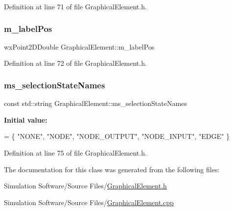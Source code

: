 Definition at line 71 of file Graphical\+Element.\+h.

\mbox{\label{class_graphical_element_acc200c4f7baf224cc972021d0c66cf35}} 
\subsubsection{\texorpdfstring{m\+\_\+label\+Pos}{m\_labelPos}}
{\footnotesize\ttfamily wx\+Point2\+D\+Double Graphical\+Element\+::m\+\_\+label\+Pos\hspace{0.3cm}{\ttfamily [protected]}}



Definition at line 72 of file Graphical\+Element.\+h.

\mbox{\label{class_graphical_element_afac661e0e1c8a699c8f8264dc99437cc}} 
\subsubsection{\texorpdfstring{ms\+\_\+selection\+State\+Names}{ms\_selectionStateNames}}
{\footnotesize\ttfamily const std\+::string Graphical\+Element\+::ms\+\_\+selection\+State\+Names\hspace{0.3cm}{\ttfamily [static]}}

{\bfseries Initial value\+:}
\begin{DoxyCode}
= \{
    \textcolor{stringliteral}{"NONE"},
    \textcolor{stringliteral}{"NODE"},
    \textcolor{stringliteral}{"NODE\_OUTPUT"},
    \textcolor{stringliteral}{"NODE\_INPUT"},
    \textcolor{stringliteral}{"EDGE"}
\}
\end{DoxyCode}


Definition at line 75 of file Graphical\+Element.\+h.



The documentation for this class was generated from the following files\+:\begin{DoxyCompactItemize}
\item 
Simulation Software/\+Source Files/\hyperlink{_graphical_element_8h}{Graphical\+Element.\+h}\item 
Simulation Software/\+Source Files/\hyperlink{_graphical_element_8cpp}{Graphical\+Element.\+cpp}\end{DoxyCompactItemize}
